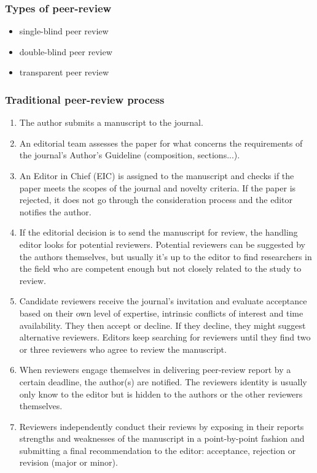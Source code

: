 \documentclass[runningheads]{llncs}
\begin{document}
\subsubsection{Types of peer-review}
\begin{itemize}
    \item single-blind peer review
    \item double-blind peer review
    \item transparent peer review
\end{itemize}

\subsubsection{Traditional peer-review process}
\begin{enumerate}
    \item The author submits a manuscript to the journal.
    \item  An editorial team  assesses the paper for what concerns the requirements of the journal's Author's Guideline (composition, sections...).
    \item An Editor in Chief (EIC) is assigned to the manuscript and checks if the paper meets the scopes of the journal and novelty criteria. If the paper is rejected, it does not go through the consideration process and the editor notifies the author.
    \item If the editorial decision is to send the manuscript for review, the handling editor looks for potential reviewers. Potential reviewers can be suggested by the authors themselves, but usually it's up to the editor to find researchers in the field who are competent enough but not closely related to the study to review.
    \item Candidate reviewers receive the journal's invitation and evaluate acceptance based on their own level of expertise, intrinsic conﬂicts of interest and time availability. They then accept or decline. If they decline, they might suggest alternative reviewers. Editors keep searching for reviewers until they find two or three reviewers who agree to review the manuscript.
    \item When reviewers engage themselves in delivering peer-review report by a certain deadline, the author(s) are notified. The reviewers identity is usually only know to the editor but is hidden to the authors or the other reviewers themselves. 
    \item Reviewers independently conduct their reviews by exposing in their reports strengths and weaknesses of the manuscript in a point-by-point fashion and submitting a final recommendation to the editor: acceptance, rejection or revision (major or minor).

\end{enumerate}
\end{document}
